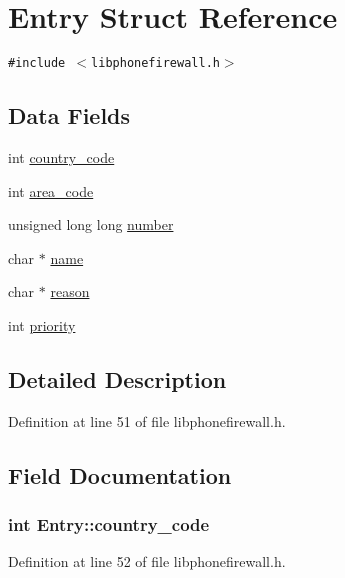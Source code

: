 \hypertarget{structEntry}{
\section{Entry Struct Reference}
\label{structEntry}
}
{\tt \#include $<$libphonefirewall.h$>$}

\subsection*{Data Fields}
\begin{CompactItemize}
\item 
int \hyperlink{structEntry_138b4e79687ff5ff6de4554db0f061fd}{country\_\-code}
\item 
int \hyperlink{structEntry_9de7b96e5b65796bd35e9dc730dcd8b3}{area\_\-code}
\item 
unsigned long long \hyperlink{structEntry_1f2177afed89936f82c130ae13fb107c}{number}
\item 
char $\ast$ \hyperlink{structEntry_272e382d3efed5f970c7939742ec9603}{name}
\item 
char $\ast$ \hyperlink{structEntry_2082cdbb815dfa8b81309cd395d32986}{reason}
\item 
int \hyperlink{structEntry_85af261b3171c257892b54a7200da061}{priority}
\end{CompactItemize}


\subsection{Detailed Description}


Definition at line 51 of file libphonefirewall.h.

\subsection{Field Documentation}
\hypertarget{structEntry_138b4e79687ff5ff6de4554db0f061fd}{
\subsubsection{\setlength{\rightskip}{0pt plus 5cm}int {\bf Entry::country\_\-code}}}
\label{structEntry_138b4e79687ff5ff6de4554db0f061fd}




Definition at line 52 of file libphonefirewall.h.

